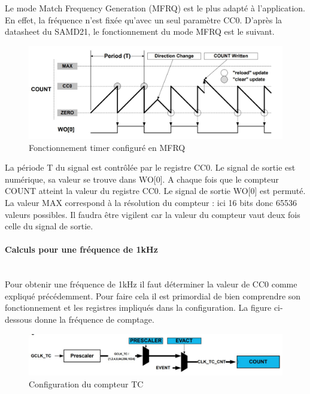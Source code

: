 \documentclass[a4paper]{article}
\begin{document}
Le mode Match Frequency Generation (MFRQ) est le plus adapté à l'application. En effet, la fréquence n'est fixée qu'avec un seul paramètre CC0. D'après la datasheet du SAMD21, le fonctionnement du mode MFRQ est le suivant. \\

\begin{figure}[H]
\centering
\includegraphics[width=12cm]{figure/Match Frequency Operation.jpg}
\caption{Fonctionnement timer configuré en MFRQ}
\label{pic2}
\end{figure}
La période T du signal est contrôlée par le registre CC0. Le signal de sortie est numérique, sa valeur se trouve dans WO[0]. A chaque fois que le compteur COUNT atteint la valeur du registre CC0.  Le signal de sortie WO[0] est permuté. La valeur MAX correspond à la résolution du compteur : ici 16 bits donc 65536 valeurs possibles. Il faudra être vigilent car la valeur du compteur vaut deux fois celle du signal de sortie.\\

\paragraph{Calculs pour une fréquence de 1kHz}
~~\\
Pour obtenir une fréquence de 1kHz il faut déterminer la valeur de CC0 comme expliqué précédemment. Pour faire cela il est primordial de bien comprendre son fonctionnement et les registres impliqués dans la configuration. La figure ci-dessous donne la fréquence de comptage. \\

\begin{figure}[htbp]
\centering
\includegraphics[width=12cm]{figure/prescaler.jpg}
\caption{Configuration du compteur TC}
\label{pic3}
\end{figure}
\end{document}
